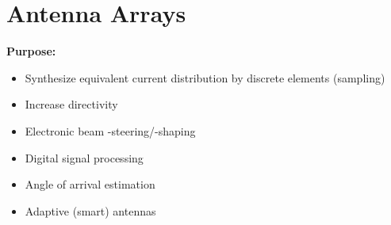 \section{Antenna Arrays}
\textbf{Purpose:}
\begin{itemize}
    \itemsep0pt
    \item Synthesize equivalent current distribution by discrete elements (sampling)
    \item Increase directivity
    \item Electronic beam -steering/-shaping
    \item Digital signal processing
    \item Angle of arrival estimation
    \item Adaptive (smart) antennas
\end{itemize}

